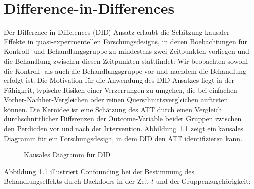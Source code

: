 \documentclass[
  a4paper,
  DIV=11,
  oneside]{scrreprt}
\begin{document}

\chapter{Difference-in-Differences}\label{difference-in-differences}

Der Difference-in-Differences (DID) Ansatz erlaubt die Schätzung
kausaler Effekte in quasi-experimentellen Forschungsdesigns, in denen
Boebachtungen für Kontroll- und Behandlungsgruppe zu mindestens zwei
Zeitpunkten vorliegen und die Behandlung zwischen diesen Zeitpunkten
stattfindet: Wir beobachten sowohl die Kontroll- als auch die
Behandlungsgruppe vor und nachdem die Behandlung erfolgt ist. Die
Motivation für die Anwendung des DID-Ansatzes liegt in der Fähigkeit,
typische Risiken einer Verzerrungen zu umgehen, die bei einfachen
Vorher-Nachher-Vergleichen oder reinen Querschnittsvergleichen auftreten
können. Die Kernidee ist eine Schätzung des ATT durch einen Vergleich
durchschnittlicher Differenzen der Outcome-Variable beider Gruppen
zwischen den Perdioden vor und nach der Intervention.
Abbildung~\ref{fig-CDDID} zeigt ein kausales Diagramm für ein
Forschungsdesign, in dem DID den ATT identifizieren kann.

\begin{figure}[t]


\caption{\label{fig-CDDID}Kausales Diagramm für DID}

\end{figure}%

Abbildung~\ref{fig-CDDID} illustriert Confounding bei der Bestimmung des
Behandlungseffekts durch Backdoors in der Zeit \(t\) und der
Gruppenzugehörigkeit:
\end{document}
